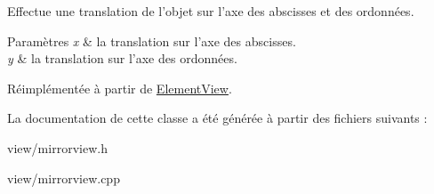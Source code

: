 Effectue une translation de l’objet sur l’axe des abscisses et des ordonnées. 


\begin{DoxyParams}{Paramètres}
{\em x} & la translation sur l’axe des abscisses. \\
\hline
{\em y} & la translation sur l’axe des ordonnées. \\
\hline
\end{DoxyParams}


Réimplémentée à partir de \hyperlink{classElementView_a69a525cb674a36e33be6a8b7a6e4b83c}{Element\+View}.



La documentation de cette classe a été générée à partir des fichiers suivants \+:\begin{DoxyCompactItemize}
\item 
view/mirrorview.\+h\item 
view/mirrorview.\+cpp\end{DoxyCompactItemize}
